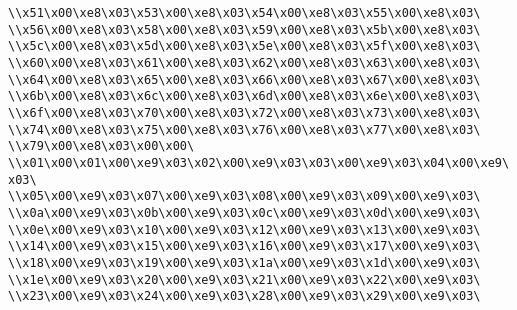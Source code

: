 \verb|\\x51\x00\xe8\x03\x53\x00\xe8\x03\x54\x00\xe8\x03\x55\x00\xe8\x03\|\newline
\verb|\\x56\x00\xe8\x03\x58\x00\xe8\x03\x59\x00\xe8\x03\x5b\x00\xe8\x03\|\newline
\verb|\\x5c\x00\xe8\x03\x5d\x00\xe8\x03\x5e\x00\xe8\x03\x5f\x00\xe8\x03\|\newline
\verb|\\x60\x00\xe8\x03\x61\x00\xe8\x03\x62\x00\xe8\x03\x63\x00\xe8\x03\|\newline
\verb|\\x64\x00\xe8\x03\x65\x00\xe8\x03\x66\x00\xe8\x03\x67\x00\xe8\x03\|\newline
\verb|\\x6b\x00\xe8\x03\x6c\x00\xe8\x03\x6d\x00\xe8\x03\x6e\x00\xe8\x03\|\newline
\verb|\\x6f\x00\xe8\x03\x70\x00\xe8\x03\x72\x00\xe8\x03\x73\x00\xe8\x03\|\newline
\verb|\\x74\x00\xe8\x03\x75\x00\xe8\x03\x76\x00\xe8\x03\x77\x00\xe8\x03\|\newline
\verb|\\x79\x00\xe8\x03\x00\x00\|\newline
\verb|\\x01\x00\x01\x00\xe9\x03\x02\x00\xe9\x03\x03\x00\xe9\x03\x04\x00\xe9\x03\|\newline
\verb|\\x05\x00\xe9\x03\x07\x00\xe9\x03\x08\x00\xe9\x03\x09\x00\xe9\x03\|\newline
\verb|\\x0a\x00\xe9\x03\x0b\x00\xe9\x03\x0c\x00\xe9\x03\x0d\x00\xe9\x03\|\newline
\verb|\\x0e\x00\xe9\x03\x10\x00\xe9\x03\x12\x00\xe9\x03\x13\x00\xe9\x03\|\newline
\verb|\\x14\x00\xe9\x03\x15\x00\xe9\x03\x16\x00\xe9\x03\x17\x00\xe9\x03\|\newline
\verb|\\x18\x00\xe9\x03\x19\x00\xe9\x03\x1a\x00\xe9\x03\x1d\x00\xe9\x03\|\newline
\verb|\\x1e\x00\xe9\x03\x20\x00\xe9\x03\x21\x00\xe9\x03\x22\x00\xe9\x03\|\newline
\verb|\\x23\x00\xe9\x03\x24\x00\xe9\x03\x28\x00\xe9\x03\x29\x00\xe9\x03\|\newline
